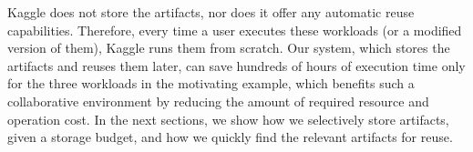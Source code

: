 Kaggle does not store the artifacts, nor does it offer any automatic reuse capabilities.
Therefore, every time a user executes these workloads (or a modified version of them), Kaggle runs them from scratch.
Our system, which stores the artifacts and reuses them later, can save hundreds of hours of execution time only for the three workloads in the motivating example, which benefits such a collaborative environment by reducing the amount of required resource and operation cost.
In the next sections, we show how we selectively store artifacts, given a storage budget, and how we quickly find the relevant artifacts for reuse.